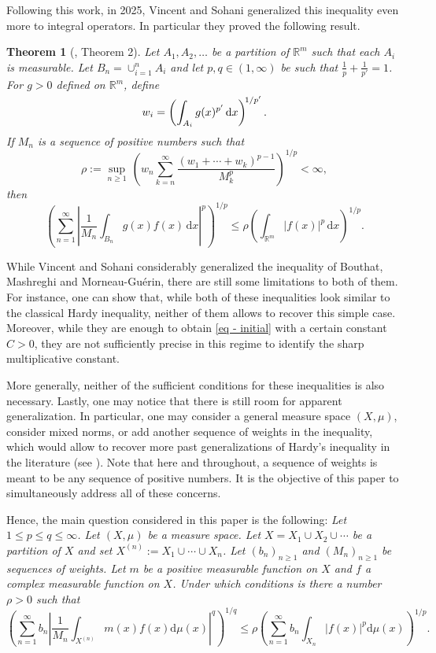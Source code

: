 \documentclass[oneside,10pt]{article}          %
\newtheorem{thm}{Theorem}
\numberwithin{equation}{section}
\begin{document}
Following this work, in 2025, Vincent and Sohani generalized this inequality even more to integral operators. In particular they proved the following result.

\begin{thm}[\cite{VincentSohani2025}, Theorem 2]\label{thm - VincentSohani}
Let $A_1,A_2,\ldots$ be a partition of $\mathbb{R}^m$ such that each $A_i$ is measurable. Let $B_n = \cup_{i=1}^n A_i$ and let $p,q \in (1,\infty)$ be such that $\frac{1}{p}+\frac{1}{p'}=1$. For $g>0$ defined on $\mathbb{R}^m$, define \vspace{-2pt}
\[ 
w_i = \left( \int_{A_i} g(x)^{p'} \,\mathrm{d}x \right)^{\!\smash{1/p'}}. 
\] 
If $M_n$ is a sequence of positive numbers such that 
\[ 
\rho := \sup_{n \geq 1} \, \left(w_n \sum_{k=n}^{\infty}\frac{(w_1+\cdots+w_k)^{p-1}}{M_k^p}\right)^{\!\!1/p} < \infty, 
\] 
then 
\[ 
\left( \sum_{n=1}^{\infty} \left| \frac{1}{M_n} \int_{B_n} g(x) f(x) \,\mathrm{d}x \right|^p \right)^{\!\!1/p} \!\leq \rho \left( \int_{\mathbb{R}^m} |f(x)|^p \,\mathrm{d}x \right)^{\!\!1/p}. 
\] 
\end{thm}


While Vincent and Sohani considerably generalized the inequality of Bouthat, Mashreghi and Morneau-Guérin, there are still some limitations to both of them. For instance, one can show that, while both of these inequalities look similar to the classical Hardy inequality, neither of them allows to recover this simple case. Moreover, while they are enough to obtain \eqref{eq - initial} with a certain constant $C>0$, they are not sufficiently precise in this regime to identify the sharp multiplicative constant.

More generally, neither of the sufficient conditions for these inequalities is also necessary. Lastly, one may notice that there is still room for apparent generalization. In particular, one may consider a general measure space $(X,\mu)$, consider mixed norms, or add another sequence of weights in the inequality, which would allow to recover more past generalizations of Hardy's inequality in the literature (see ). Note that here and throughout, a sequence of weights is meant to be any sequence of positive numbers. It is the objective of this paper to simultaneously address all of these concerns.

Hence, the main question considered in this paper is the following: \emph{Let $1 \leq p\leq q\leq \infty$. Let $(X,\mu)$ be a measure space. Let $X = X_1 \cup X_2 \cup \cdots$ be a partition of $X$ and set $X^{(n)} := X_1 \cup \cdots \cup X_n$. Let $(b_n)_{n\geq 1}$ and $(M_n)_{n\geq 1}$ be sequences of weights. Let $m$ be a positive measurable function on $X$ and $f$ a complex measurable function on $X$. Under which conditions is there a number $\rho>0$ such that
\begin{equation}\label{eq - goal}
    \left(\sum_{n = 1}^\infty b_n \left| \frac{1}{M_n} \int_{X^{(n)}} m (x) f (x)  \mathrm{d}\mu (x) \right|^q\right)^{\!\!1/q} \!\!\leq \rho \left(\sum_{n = 1}^\infty b_n \int_{X_n} |f (x)|^p  \mathrm{d}\mu (x) \right)^{\!\!1/p}.
\end{equation}
}
\end{document}
